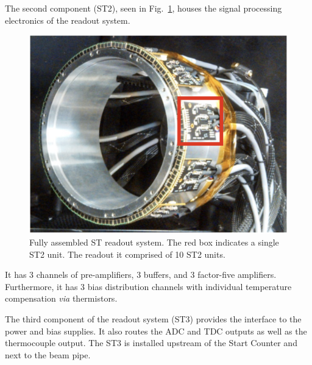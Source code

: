 The second component (ST2), seen in Fig.~\ref{fig:stfullreadout}, houses the signal processing electronics of the readout system.
	\begin{figure}[!htb]
		\centering
		\includegraphics[width=1.0\columnwidth]{design/figs/st_full_readout_v2}
		\caption{Fully assembled ST readout system.  The red box indicates a single ST2 unit.  The readout it comprised of 10 ST2 units.}
		\label{fig:stfullreadout}
	\end{figure}
It has 3 channels of pre-amplifiers, 3 buffers, and 3 factor-five amplifiers.  Furthermore, it has 3 bias distribution channels with individual temperature compensation \emph{via} thermistors. %

The third component of the readout system (ST3) provides the interface to the power and bias supplies.  It also routes the ADC and TDC outputs as well as the thermocouple output.  The ST3 is installed upstream of the Start Counter and next to the beam pipe.